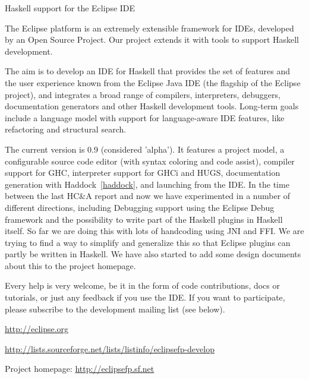 \begin{hcarentry}[updated]{Haskell support for the Eclipse IDE}
\label{eclipsefp}
\makeheader

The Eclipse platform is an extremely extensible framework for IDEs,
developed by an Open Source Project. Our project extends it with tools
to support Haskell development.

The aim is to develop an IDE for Haskell that provides the set of features and
the user experience known from the Eclipse Java IDE (the flagship of the
Eclipse project), and integrates a broad range of compilers, interpreters,
debuggers, documentation generators and other Haskell development tools.
Long-term goals include a language model with support for language-aware IDE
features, like refactoring and structural search.

The current version is 0.9 (considered 'alpha'). It features a project model,
a configurable source code editor (with syntax coloring and code assist),
compiler support for GHC, interpreter support for GHCi and HUGS, documentation
generation with Haddock~\cref{haddock}, and launching from the IDE. In the
time between the last HC\&A report and now we have experimented in a number of
different directions, including Debugging support using the Eclipse Debug 
framework and the possibility to write part of the Haskell plugins in Haskell
itself. So far we are doing this with lots of handcoding using JNI and FFI. We
are trying to find a way to simplify and generalize this so that Eclipse plugins
can partly be written in Haskell. We have also started to add some design 
documents about this to the project homepage.

Every help is very welcome, be it in the form of code contributions, docs or
tutorials, or just any feedback if you use the IDE. If you want to
participate, please subscribe to the development mailing list (see below).

\FurtherReading
\begin{compactitem}
\item \url{http://eclipse.org}
\item \url{http://lists.sourceforge.net/lists/listinfo/eclipsefp-develop}
\item Project homepage: \url{http://eclipsefp.sf.net}
\end{compactitem}
\end{hcarentry}
